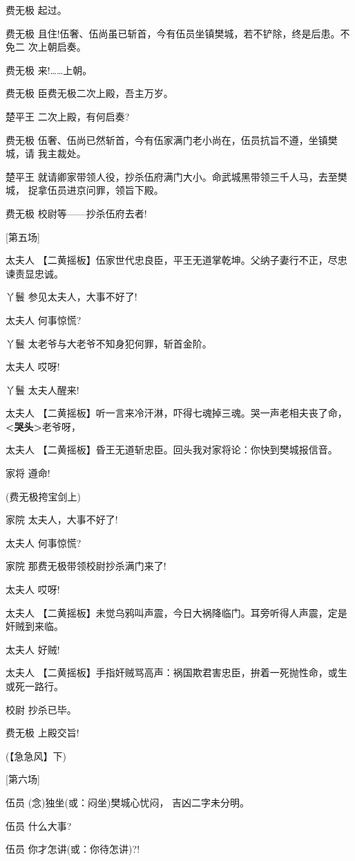 费无极 起过。

费无极
且住!伍奢、伍尚虽已斩首，今有伍员坐镇樊城，若不铲除，终是后患。不免二
次上朝启奏。

费无极 来!\ldots{}\ldots{}上朝。

费无极 臣费无极二次上殿，吾主万岁。

楚平王 二次上殿，有何启奏?

费无极
伍奢、伍尚已然斩首，今有伍家满门老小尚在，伍员抗旨不遵，坐镇樊城，请
我主裁处。

楚平王
就请卿家带领人役，抄杀伍府满门大小。命武城黑带领三千人马，去至樊城，
捉拿伍员进京问罪，领旨下殿。

费无极 校尉等------抄杀伍府去者!

{[}第五场{]}

太夫人
【二黄摇板】伍家世代忠良臣，平王无道掌乾坤。父纳子妻行不正，尽忠谏责显忠诚。

丫鬟 参见太夫人，大事不好了!

太夫人 何事惊慌?

丫鬟 太老爷与大老爷不知身犯何罪，斩首金阶。

太夫人 哎呀!

丫鬟 太夫人醒来!

太夫人
【二黄摇板】听一言来冷汗淋，吓得七魂掉三魂。哭一声老相夫丧了命，\textbf{\textless{}哭头\textgreater{}}老爷呀，

太夫人 【二黄摇板】昏王无道斩忠臣。回头我对家将论：你快到樊城报信音。

家将 遵命!

(费无极挎宝剑上)

家院 太夫人，大事不好了!

太夫人 何事惊慌?

家院 那费无极带领校尉抄杀满门来了!

太夫人 哎呀!

太夫人
【二黄摇板】未觉乌鸦叫声震，今日大祸降临门。耳旁听得人声震，定是奸贼到来临。

太夫人 好贼!

太夫人
【二黄摇板】手指奸贼骂高声：祸国欺君害忠臣，拚着一死抛性命，或生或死一路行。

校尉 抄杀已毕。

费无极 上殿交旨!

(【急急风】下)

{[}第六场{]}

伍员 (念)独坐(或：闷坐)樊城心忧闷， 吉凶二字未分明。

伍员 什么大事?

伍员 你才怎讲(或：你待怎讲)?!

